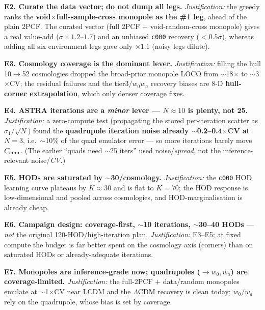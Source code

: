\documentclass[11pt]{article}
\newcommand{\code}[1]{\texttt{#1}}
\newcommand{\Cemu}{C_{\rm emu}}
\begin{document}
\textbf{E2. Curate the data vector; do not dump all legs.} \emph{Justification:} the
greedy ranks the \textbf{void$\times$full-sample-cross monopole as the \#1 leg}, ahead of
the plain 2PCF. The curated vector (full 2PCF $+$ void-random-cross monopole) gives a
real value-add ($\sigma\times1.2$--$1.7$) and an unbiased \code{c000} recovery
($<0.5\sigma$), whereas adding all six environment legs gave only $\times1.1$ (noisy
legs dilute).

\textbf{E3. Cosmology coverage is the dominant lever.} \emph{Justification:} filling the
hull 10$\to$52 cosmologies dropped the broad-prior monopole LOCO from $\sim$18$\times$ to
$\sim$3$\times$CV; the residual failures and the tier3$/w_0w_a$ recovery biases are 8-D
\textbf{hull-corner extrapolation}, which only denser coverage fixes.

\textbf{E4. ASTRA iterations are a \emph{minor} lever --- $N\approx10$ is plenty, not 25.}
\emph{Justification:} a zero-compute test (propagating the stored per-iteration scatter
as $\sigma_1/\sqrt{N}$) found the \textbf{quadrupole iteration noise already
$\sim$0.2--0.4$\times$CV at $N=3$}, i.e.\ $\sim$10\% of the quad emulator error --- so
more iterations barely move $\Cemu$. (The earlier ``quads need $\sim$25 iters'' used
noise/\emph{spread}, not the inference-relevant noise/\emph{CV}.)

\textbf{E5. HODs are saturated by $\sim$30/cosmology.} \emph{Justification:} the \code{c000}
HOD learning curve plateaus by $K\!\approx\!30$ and is flat to $K=70$; the HOD response is
low-dimensional and pooled across cosmologies, and HOD-marginalisation is already cheap.

\textbf{E6. Campaign design: coverage-first, $\sim$10 iterations, $\sim$30--40 HODs} ---
\emph{not} the original 120-HOD/high-iteration plan. \emph{Justification:} E3--E5; at
fixed compute the budget is far better spent on the cosmology axis (corners) than on
saturated HODs or already-adequate iterations.

\textbf{E7. Monopoles are inference-grade now; quadrupoles ($\to w_0,w_a$) are
coverage-limited.} \emph{Justification:} the full-2PCF $+$ data/random monopoles emulate
at $\sim$1$\times$CV near LCDM and the $\Lambda$CDM recovery is clean today; $w_0/w_a$
rely on the quadrupole, whose bias is set by coverage.
\end{document}
